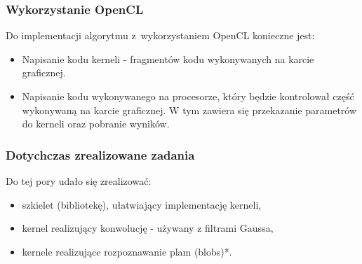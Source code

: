 \begin{frame}
\frametitle{Wykorzystanie OpenCL}

Do implementacji algorytmu z~wykorzystaniem OpenCL konieczne jest:
\begin{itemize}
\item Napisanie kodu kerneli - fragmentów kodu wykonywanych na karcie graficznej.
\item Napisanie kodu wykonywanego na procesorze, który będzie kontrolował część wykonywaną na karcie graficznej. W tym zawiera się przekazanie parametrów do kerneli oraz pobranie wyników.
\end{itemize}

\end{frame}


\begin{frame}
\frametitle{Dotychczas zrealizowane zadania}

Do tej pory udało się zrealizować:
\begin{itemize}
\item szkielet (bibliotekę), ułatwiający implementację kerneli,
\item kernel realizujący konwolucję - używany z filtrami Gaussa,
\item kernele realizujące rozpoznawanie plam (blobs)*.
\end{itemize}

\end{frame}


